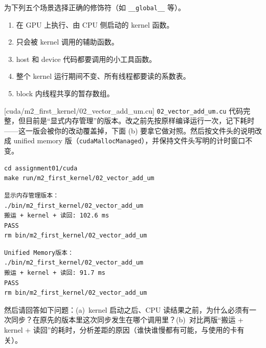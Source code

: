 \documentclass[11pt,a4paper,fontset=none]{ctexart}
\begin{document}
为下列五个场景选择正确的修饰符（如 \texttt{\_\_global\_\_} 等）。
\begin{enumerate}[label=(\alph*)]
  \item 在 GPU 上执行、由 CPU 侧启动的 kernel 函数。
  \item 只会被 kernel 调用的辅助函数。
  \item host 和 device 代码都要调用的小工具函数。
  \item 整个 kernel 运行期间不变、所有线程都要读的系数表。
  \item block 内线程共享的暂存数组。
\end{enumerate}

[cuda/m2\_first\_kernel/02\_vector\_add\_um.cu]
\texttt{02\_vector\_add\_um.cu} 代码完整，但目前是“显式内存管理”的版本。改之前先按原样编译运行一次，记下耗时——这一版会被你的改动覆盖掉，下面 (b) 要拿它做对照。然后按文件头的说明改成 unified memory 版（\texttt{cudaMallocManaged}），并保持文件头写明的计时窗口不变。

\begin{lstlisting}
cd assignment01/cuda
make run/m2_first_kernel/02_vector_add_um
\end{lstlisting}

\begin{lstlisting}
显示内存管理版本：
./bin/m2_first_kernel/02_vector_add_um
搬运 + kernel + 读回: 102.6 ms
PASS
rm bin/m2_first_kernel/02_vector_add_um
\end{lstlisting}

\begin{lstlisting}
Unified Memory版本：
./bin/m2_first_kernel/02_vector_add_um
搬运 + kernel + 读回: 91.7 ms
PASS
rm bin/m2_first_kernel/02_vector_add_um
\end{lstlisting}

然后请回答如下问题：(a)~kernel 启动之后、CPU 读结果之前，为什么必须有一次同步？在原先的版本里这次同步发生在哪个调用里？(b)~对比两版“搬运 + kernel + 读回”的耗时，分析差距的原因（谁快谁慢都有可能，与使用的卡有关）。

\end{document}

